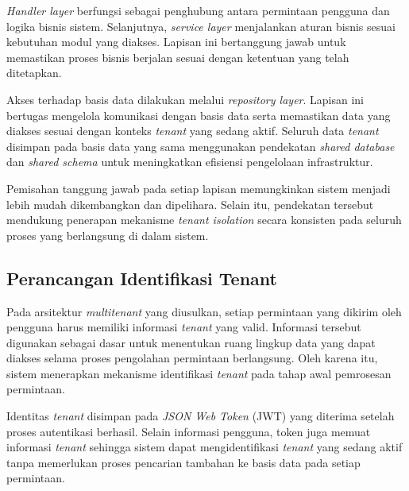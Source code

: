 \textit{Handler layer} berfungsi sebagai penghubung antara permintaan pengguna dan logika bisnis sistem. Selanjutnya, \textit{service layer} menjalankan aturan bisnis sesuai kebutuhan modul yang diakses. Lapisan ini bertanggung jawab untuk memastikan proses bisnis berjalan sesuai dengan ketentuan yang telah ditetapkan.

Akses terhadap basis data dilakukan melalui \textit{repository layer}. Lapisan ini bertugas mengelola komunikasi dengan basis data serta memastikan data yang diakses sesuai dengan konteks \textit{tenant} yang sedang aktif. Seluruh data \textit{tenant} disimpan pada basis data yang sama menggunakan pendekatan \textit{shared database} dan \textit{shared schema} untuk meningkatkan efisiensi pengelolaan infrastruktur.

Pemisahan tanggung jawab pada setiap lapisan memungkinkan sistem menjadi lebih mudah dikembangkan dan dipelihara. Selain itu, pendekatan tersebut mendukung penerapan mekanisme \textit{tenant isolation} secara konsisten pada seluruh proses yang berlangsung di dalam sistem.

\subsection{Perancangan Identifikasi Tenant}

Pada arsitektur \textit{multitenant} yang diusulkan, setiap permintaan yang dikirim oleh pengguna harus memiliki informasi \textit{tenant} yang valid. Informasi tersebut digunakan sebagai dasar untuk menentukan ruang lingkup data yang dapat diakses selama proses pengolahan permintaan berlangsung. Oleh karena itu, sistem menerapkan mekanisme identifikasi \textit{tenant} pada tahap awal pemrosesan permintaan.

Identitas \textit{tenant} disimpan pada \textit{JSON Web Token} (JWT) yang diterima setelah proses autentikasi berhasil. Selain informasi pengguna, token juga memuat informasi \textit{tenant} sehingga sistem dapat mengidentifikasi \textit{tenant} yang sedang aktif tanpa memerlukan proses pencarian tambahan ke basis data pada setiap permintaan.

